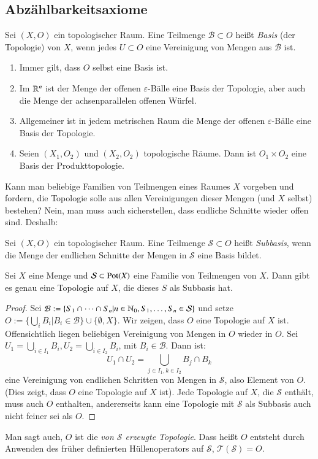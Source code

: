 \documentclass[a4paper,10pt]{scrartcl}
\newcommand{\eps}{\varepsilon}
\begin{document}
\subsection{Abzählbarkeitsaxiome}
\begin{df}
 Sei $(X,O)$ ein topologischer Raum. Eine Teilmenge $\mathcal B\subset O$ heißt \emph{Basis} (der Topologie) von $X$, wenn jedes $U\subset O$ eine Vereinigung von Mengen aus $\mathcal B$ ist.
\end{df}
\begin{exs*}
 \begin{enumerate}
  \item Immer gilt, dass $O$ selbst eine Basis ist.
  \item Im $\mathbb{R}^n$ ist der Menge der offenen $\eps$-Bälle eine Basis der Topologie, aber auch die Menge der achsenparallelen offenen Würfel.
  \item Allgemeiner ist in jedem metrischen Raum die Menge der offenen $\eps$-Bälle eine Basis der Topologie.
  \item Seien $(X_1,O_2)$ und $(X_2,O_2)$ topologische Räume. Dann ist $O_1\times O_2$ eine Basis der Produkttopologie.
\end{enumerate}
\end{exs*}
Kann man beliebige Familien von Teilmengen eines Raumes $X$ vorgeben und fordern, die Topologie solle aus allen Vereinigungen dieser Mengen (und $X$ selbst) bestehen? Nein, man muss auch sicherstellen, dass endliche Schnitte wieder offen sind. Deshalb:
\begin{df}
 Sei $(X,O)$ ein topologischer Raum. Eine Teilmenge $\mathcal S\subset O$ heißt \emph{Subbasis}, wenn die Menge der endlichen Schnitte der Mengen in $\mathcal S$ eine Basis bildet.
\end{df}
\begin{st}\label{thm:4.3}
 Sei $X$ eine Menge und $\mathcal S\subset \operatorname{Pot}(X)$  eine Familie von Teilmengen von $X$. Dann gibt es genau eine Topologie auf $X$, die dieses $S$ als Subbasis hat.
\end{st}
\begin{proof}
Sei $\mathcal B:=\{S_1\cap\dotsb \cap S_n|n\in \mathbb{N}_0, S_1,\dotsc  ,S_n\in \mathcal S\}$ und setze $O:=\{\bigcup_iB_i|B_i\in \mathcal B\} \cup\{\emptyset,X\}$.
 Wir zeigen, dass $O$ eine Topologie auf $X$ ist. Offensichtlich liegen beliebigen Vereinigung von Mengen in $O$ wieder in $O$. 
Sei $U_1=\bigcup_{i\in I_1}B_i, U_2=\bigcup_{i\in I_2}B_i$, mit $B_i\in \mathcal B$. Dann ist:
\[
 U_1\cap U_2=\bigcup\limits_{j\in I_1,k\in I_2}B_j\cap B_k
\]
eine Vereinigung von endlichen Schritten von Mengen in $\mathcal S$, also Element von $O$. (Dies zeigt, dass $O$ eine Topologie auf $X$ ist). 
Jede Topologie auf $X$, die $\mathcal S$ enthält, muss auch $O$ enthalten, andererseits kann eine Topologie mit $\mathcal S$ als Subbasis auch nicht feiner sei als $O$.
\end{proof}
Man sagt auch, $O$ ist die \emph{von $\mathcal S$ erzeugte Topologie}. Dass heißt $O$ entsteht durch Anwenden des früher definierten
Hüllenoperators auf $\mathcal S$, $\mathcal T(\mathcal S)=O$.
\end{document}
